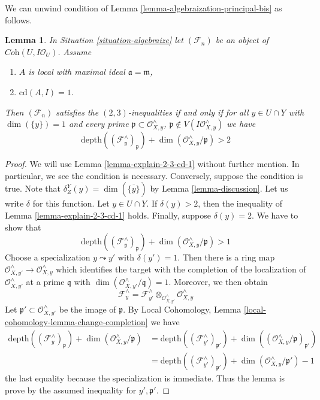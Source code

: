 \documentclass{stacks-project}
\theoremstyle{plain}
\newtheorem{lemma}[subsection]{Lemma}
\theoremstyle{definition}
\theoremstyle{remark}
\numberwithin{equation}{subsection}
\begin{document}
\noindent
We can unwind condition of
Lemma \ref{lemma-algebraization-principal-bis} as follows.

\begin{lemma}
\label{lemma-unwinding-conditions}
In Situation \ref{situation-algebraize} let $(\mathcal{F}_n)$ be an object
of $\textit{Coh}(U, I\mathcal{O}_U)$. Assume
\begin{enumerate}
\item $A$ is local with maximal ideal $\mathfrak a = \mathfrak m$,
\item $\text{cd}(A, I) = 1$.
\end{enumerate}
Then $(\mathcal{F}_n)$ satisfies the $(2, 3)$-inequalities if and only
if for all $y \in U \cap Y$ with $\dim(\{y\}) = 1$ and every prime
$\mathfrak p \subset \mathcal{O}_{X, y}^\wedge$,
$\mathfrak p \not \in V(I\mathcal{O}_{X, y}^\wedge)$ we have
$$
\text{depth}((\mathcal{F}_y^\wedge)_\mathfrak p) +
\dim(\mathcal{O}_{X, y}^\wedge/\mathfrak p) > 2
$$
\end{lemma}

\begin{proof}
We will use Lemma \ref{lemma-explain-2-3-cd-1}
without further mention. In particular, we see the condition is necessary.
Conversely, suppose the condition is true.
Note that $\delta^Y_Z(y) = \dim(\overline{\{y\}})$ by
Lemma \ref{lemma-discussion}. Let us write $\delta$ for this function.
Let $y \in U \cap Y$. If $\delta(y) > 2$, then the inequality
of Lemma \ref{lemma-explain-2-3-cd-1} holds.
Finally, suppose $\delta(y) = 2$. We have to show that
$$
\text{depth}((\mathcal{F}_y^\wedge)_\mathfrak p) +
\dim(\mathcal{O}_{X, y}^\wedge/\mathfrak p) > 1
$$
Choose a specialization $y \leadsto y'$ with $\delta(y') = 1$. Then
there is a ring map $\mathcal{O}_{X, y'}^\wedge \to \mathcal{O}_{X, y}^\wedge$
which identifies the target with the completion of the localization
of $\mathcal{O}_{X, y'}^\wedge$ at a prime $\mathfrak q$
with $\dim(\mathcal{O}_{X, y'}^\wedge/\mathfrak q) = 1$.
Moreover, we then obtain
$$
\mathcal{F}_y^\wedge =
\mathcal{F}_{y'}^\wedge
\otimes_{\mathcal{O}_{X, y'}^\wedge}
\mathcal{O}_{X, y}^\wedge
$$
Let $\mathfrak p' \subset \mathcal{O}_{X, y'}^\wedge$ be the image
of $\mathfrak p$.
By Local Cohomology, Lemma \ref{local-cohomology-lemma-change-completion}
we have
\begin{align*}
\text{depth}((\mathcal{F}_y^\wedge)_\mathfrak p) +
\dim(\mathcal{O}_{X, y}^\wedge/\mathfrak p)
& =
\text{depth}((\mathcal{F}_{y'}^\wedge)_{\mathfrak p'}) +
\dim((\mathcal{O}_{X, y}^\wedge/\mathfrak p)_{\mathfrak p'}) \\
& =
\text{depth}((\mathcal{F}_{y'}^\wedge)_{\mathfrak p'}) +
\dim(\mathcal{O}_{X, y}^\wedge/\mathfrak p') - 1
\end{align*}
the last equality because the specialization is immediate.
Thus the lemma is prove by the assumed inequality for $y', \mathfrak p'$.
\end{proof}
\end{document}

